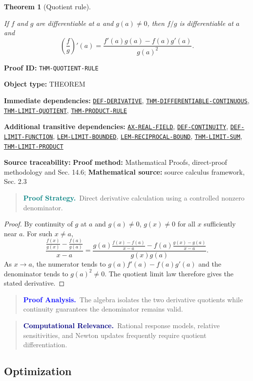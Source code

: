 \documentclass[10pt]{article}
\newcommand{\pidraw}[1]{\begingroup\urlstyle{tt}\nolinkurl{#1}\endgroup}
\newcommand{\pidref}[1]{\hyperref[prf:#1]{\pidraw{#1}}}
\newtheorem{theorem}{Theorem}[section]
\theoremstyle{definition}
\theoremstyle{remark}
\newenvironment{proofstrategy}
{\begin{quote}\small\noindent\textbf{\textcolor{teal}{Proof Strategy.}}\ }
{\end{quote}}
\newenvironment{proofanalysis}
{\begin{quote}\small\noindent\textbf{\textcolor{blue}{Proof Analysis.}}\ }
{\end{quote}}
\newenvironment{computationalrelevance}
{\begin{quote}\small\noindent\textbf{\textcolor{navy}{Computational Relevance.}}\ }
{\end{quote}}
\newcommand{\meta}[2]{\noindent\textbf{#1:} #2\par}
\begin{document}
\begin{theorem}[Quotient rule]\label{prf:THM-QUOTIENT-RULE}

If $f$ and $g$ are differentiable at $a$ and $g(a)\ne0$, then $f/g$ is differentiable at $a$ and
\[
\left(\frac{f}{g}\right)'(a)=
\frac{f'(a)g(a)-f(a)g'(a)}{g(a)^2}.
\]

\end{theorem}

\meta{Proof ID}{\pidraw{THM-QUOTIENT-RULE}}
\meta{Object type}{THEOREM}
\meta{Immediate dependencies}{\pidref{DEF-DERIVATIVE}, \pidref{THM-DIFFERENTIABLE-CONTINUOUS}, \pidref{THM-LIMIT-QUOTIENT}, \pidref{THM-PRODUCT-RULE}}
\meta{Additional transitive dependencies}{\pidref{AX-REAL-FIELD}, \pidref{DEF-CONTINUITY}, \pidref{DEF-LIMIT-FUNCTION}, \pidref{LEM-LIMIT-BOUNDED}, \pidref{LEM-RECIPROCAL-BOUND}, \pidref{THM-LIMIT-SUM}, \pidref{THM-LIMIT-PRODUCT}}
\meta{Source traceability}{\textbf{Proof method:} Mathematical Proofs, direct-proof methodology and Sec. 14.6; \textbf{Mathematical source:} source calculus framework, Sec. 2.3}

\begin{proofstrategy}Direct derivative calculation using a controlled nonzero denominator.\end{proofstrategy}

\begin{proof}

By continuity of $g$ at $a$ and $g(a)\ne0$, $g(x)\ne0$ for all $x$ sufficiently
near $a$. For such $x\ne a$,
\[
\frac{\frac{f(x)}{g(x)}-\frac{f(a)}{g(a)}}{x-a}
=
\frac{g(a)\frac{f(x)-f(a)}{x-a}
      -f(a)\frac{g(x)-g(a)}{x-a}}
     {g(x)g(a)}.
\]
As $x\to a$, the numerator tends to
$g(a)f'(a)-f(a)g'(a)$ and the denominator tends to $g(a)^2\ne0$.
The quotient limit law therefore gives the stated derivative.

\end{proof}

\begin{proofanalysis}The algebra isolates the two derivative quotients while continuity guarantees the denominator remains valid.\end{proofanalysis}

\begin{computationalrelevance}Rational response models, relative sensitivities, and Newton updates frequently require quotient differentiation.\end{computationalrelevance}

\subsection{Optimization}
\end{document}
